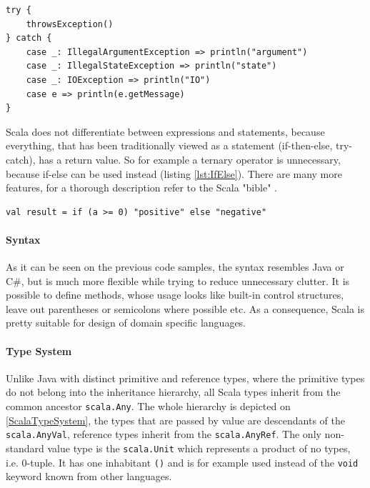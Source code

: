 \documentclass[12pt,a4paper]{report}
\begin{document}
\begin{lstlisting}[frame=single,caption={Catch block.},label={lst:CatchBlock}]
try {
    throwsException()
} catch {
    case _: IllegalArgumentException => println("argument")
    case _: IllegalStateException => println("state")
    case _: IOException => println("IO")
    case e => println(e.getMessage)
}
\end{lstlisting}

Scala does not differentiate between expressions and statements, because everything, that has been traditionally viewed as a statement (if-then-else, try-catch), has a return value. So for example a ternary operator is unnecessary, because if-else can be used instead (listing \ref{lst:IfElse}). There are many more features, for a thorough description refer to the Scala "bible" \cite{ScalaProgramming}.

\begin{lstlisting}[frame=single,caption={If-else as a ternary operator.},label={lst:IfElse}]
val result = if (a >= 0) "positive" else "negative"
\end{lstlisting}

\paragraph{Syntax} As it can be seen on the previous code samples, the syntax resembles Java or C\#, but is much more flexible while trying to reduce unnecessary clutter. It is possible to define methods, whose usage looks like built-in control structures, leave out parentheses or semicolons where possible etc. As a consequence, Scala is pretty suitable for design of domain specific languages. 

\paragraph{Type System} Unlike Java with distinct primitive and reference types, where the primitive types do not belong into the inheritance hierarchy, all Scala types inherit from the common ancestor \texttt{scala.Any}. The whole hierarchy is depicted on \ref{ScalaTypeSystem}, the types that are passed by value are descendants of the \texttt{scala.AnyVal}, reference types inherit from the \texttt{scala.AnyRef}. The only non-standard value type is the \texttt{scala.Unit} which represents a product of no types, i.e. 0-tuple. It has one inhabitant \texttt{()} and is for example used instead of the \texttt{void} keyword known from other languages.
\end{document}
